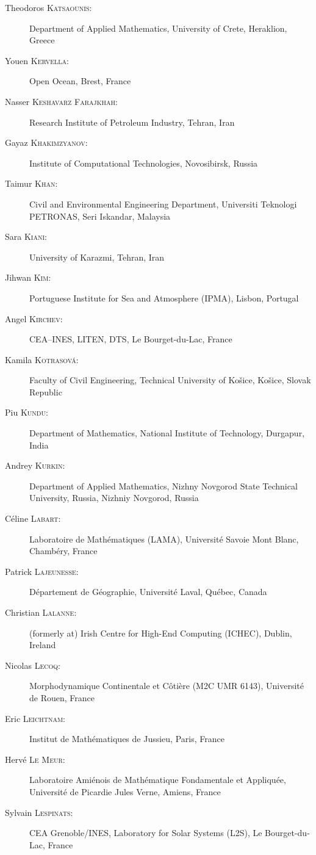 \begin{description}
  \item[Theodoros \textsc{Katsaounis}:] Department of Applied Mathematics, University of Crete, Heraklion, Greece
  \item[Youen \textsc{Kervella}:] Open Ocean, Brest, France
  \item[Nasser \textsc{Keshavarz Farajkhah}:] Research Institute of Petroleum Industry, Tehran, Iran
  \item[Gayaz \textsc{Khakimzyanov}:] Institute of Computational Technologies, Novosibirsk, Russia
  \item[Taimur \textsc{Khan}:] Civil and Environmental Engineering Department, Universiti Teknologi PETRONAS, Seri Iskandar, Malaysia
  \item[Sara \textsc{Kiani}:] University of Karazmi, Tehran, Iran
  \item[Jihwan \textsc{Kim}:] Portuguese Institute for Sea and Atmosphere (IPMA), Lisbon, Portugal 
  \item[Angel \textsc{Kirchev}:] CEA--INES, LITEN, DTS, Le Bourget-du-Lac, France
  \item[Kamila \textsc{Kotrasová}:] Faculty of Civil Engineering, Technical University of Košice, Košice, Slovak Republic
  \item[Piu \textsc{Kundu}:] Department of Mathematics, National Institute of Technology, Durgapur, India
  \item[Andrey \textsc{Kurkin}:] Department of Applied Mathematics, Nizhny Novgorod State Technical University, Russia, Nizhniy Novgorod, Russia
  \item[C\'eline \textsc{Labart}:] Laboratoire de Math\'ematiques (LAMA), Universit\'e Savoie Mont Blanc, Chamb\'ery, France
  \item[Patrick \textsc{Lajeunesse}:] D\'epartement de G\'eographie, Universit\'e Laval, Qu\'ebec, Canada
  \item[Christian \textsc{Lalanne}:] (formerly at) Irish Centre for High-End Computing (ICHEC), Dublin, Ireland
  \item[Nicolas \textsc{Lecoq}:] Morphodynamique Continentale et C\^oti\`ere (M2C UMR 6143), Universit\'e de Rouen, France
  \item[Eric \textsc{Leichtnam}:] Institut de Math\'ematiques de Jussieu, Paris, France
  \item[Herv\'e \textsc{Le Meur}:] Laboratoire Ami\'enois de Math\'ematique Fondamentale et Appliqu\'ee, Universit\'e de Picardie Jules Verne, Amiens, France
  \item[Sylvain \textsc{Lespinats}:] CEA Grenoble/INES, Laboratory for Solar Systems (L2S), Le Bourget-du-Lac, France

\end{description}
